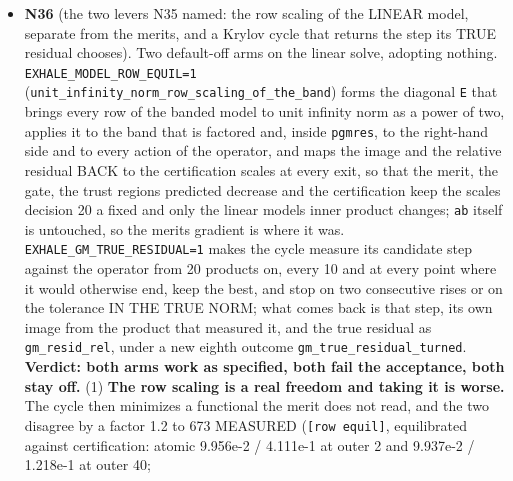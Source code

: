 \documentclass[english,a4paper]{my_memo}
\begin{document}
\begin{itemize}
  few tens of products. Advisor: rebuild on \texttt{build\_lwv}; \texttt{krylov\_and\_dogleg} 251/0, \texttt{steady\_species\_rows} 194/0; atomic reload at cap 40 with every hook off, 8 threads: the N31 ladder to the digit (7.607e-2 at 40, handed back 5.377e-2). Accepted; deliverable 4 correctly not built. The two levers named are the LINEAR model\textquotesingle s row scaling (a freedom decision 20 a did not fix: the merit and gate keep the certification scales, the linear inner product may differ) and a Krylov cycle that returns the step its TRUE residual chooses (the optimum lies at 60 to 80 products; the reduced residual lies past it). \textbf{Next item N36}: both as measured arms, default off.
\item
  \textbf{N36} (the two levers N35 named: the row scaling of the LINEAR model,
  separate from the merit\textquotesingle s, and a Krylov cycle that returns the step its
  TRUE residual chooses). Two default-off arms on the linear solve,
  adopting nothing. \texttt{EXHALE\_MODEL\_ROW\_EQUIL=1}
  (\texttt{unit\_infinity\_norm\_row\_scaling\_of\_the\_band}) forms the diagonal \texttt{E}
  that brings every row of the banded model to unit infinity norm as a
  power of two, applies it to the band that is factored and, inside
  \texttt{pgmres}, to the right-hand side and to every action of the operator,
  and maps the image and the relative residual BACK to the certification
  scales at every exit, so that the merit, the gate, the trust region\textquotesingle s
  predicted decrease and the certification keep the scales decision 20 a
  fixed and only the linear model\textquotesingle s inner product changes; \texttt{ab} itself is
  untouched, so the merit\textquotesingle s gradient is where it was.
  \texttt{EXHALE\_GM\_TRUE\_RESIDUAL=1} makes the cycle measure its candidate step
  against the operator from 20 products on, every 10 and at every point
  where it would otherwise end, keep the best, and stop on two consecutive
  rises or on the tolerance IN THE TRUE NORM; what comes back is that
  step, its own image from the product that measured it, and the true
  residual as \texttt{gm\_resid\_rel}, under a new eighth outcome
  \texttt{gm\_true\_residual\_turned}. \textbf{Verdict: both arms work as specified, both
  fail the acceptance, both stay off.} (1) \textbf{The row scaling is a real
  freedom and taking it is worse.} The cycle then minimizes a functional
  the merit does not read, and the two disagree by a factor 1.2 to 673
  MEASURED (\texttt{{[}row\ equil{]}}, equilibrated against certification: atomic
  9.956e-2 / 4.111e-1 at outer 2 and 9.937e-2 / 1.218e-1 at outer 40;

\end{itemize}
\end{document}
